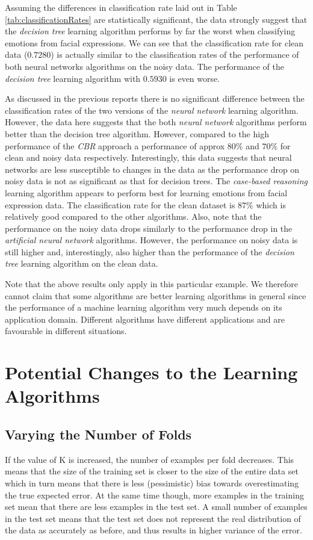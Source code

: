 \documentclass[10pt,a4paper]{article}
\begin{document}
Assuming the differences in classification rate laid out in Table \ref{tab:classificationRates} are statistically significant, the data strongly suggest that the \emph{decision tree} learning algorithm performs by far the worst when classifying emotions from facial expressions. We can see that the classification rate for clean data ($0.7280$) is actually similar to the classification rates of the performance of both neural networks algorithms on the noisy data. The performance of the \emph{decision tree} learning algorithm with $0.5930$ is even worse.

As discussed in the previous reports there is no significant difference between the classification rates of the two versions of the \emph{neural network} learning algorithm. However, the data here suggests that the both \emph{neural network} algorithms perform better than the decision tree algorithm. However, compared to the high performance of the \emph{CBR} approach a performance of approx $80\%$ and $70\%$ for clean and noisy data respectively. Interestingly, this data suggests that neural networks are less susceptible to changes in the data as the performance drop on noisy data is not as significant as that for decision trees. The \emph{case-based reasoning} learning algorithm appears to perform best for learning emotions from facial expression data. The classification rate for the clean dataset is $87\%$ which is relatively good compared to the other algorithms. Also, note that the performance on the noisy data drops similarly to the performance drop in the \emph{artificial neural network} algorithms. However, the performance on noisy data is still higher and, interestingly, also higher than the performance of the \emph{decision tree} learning algorithm on the clean data.

Note that the above results only apply in this particular example. We therefore cannot claim that some algorithms are better learning algorithms in general since the performance of a machine learning algorithm very much depends on its application domain. Different algorithms have different applications and are favourable in different situations.

\section{Potential Changes to the Learning Algorithms}
\subsection{Varying the Number of Folds}
If the value of K is increased, the number of examples per fold decreases. This means that the size of the training set is closer to the size of the entire data set which in turn means that there is less (pessimistic) bias towards overestimating the true expected error. At the same time though, more examples in the training set mean that there are less examples in the test set. A small number of examples in the test set means that the test set does not represent the real distribution of the data as accurately as before, and thus results in higher variance of the error.
\end{document}
